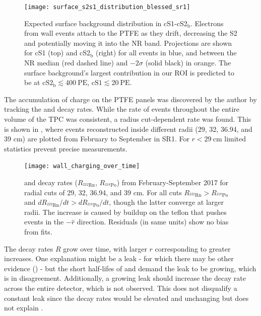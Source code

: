 \begin{figure}
\centering
\texttt{[image: surface\_s2s1\_distribution\_blessed\_sr1]}
\caption{Expected surface background distribution in cS1-cS2$_{\mathrm{b}}$.  Electrons from wall events attach to the PTFE as they drift,
decreasing the S2 and potentially moving it into the NR band.  Projections are
shown for cS1 (top) and cS2$_{\mathrm{b}}$ (right) for all events in blue, and between the NR median (red dashed line) and
$-2 \sigma$ (solid black) in orange.  The surface background's largest contribution in our ROI is predicted to be at
$\mathrm{cS2_{\mathrm{b}}} \lesssim 400\ \mathrm{PE}$, $\mathrm{cS1} \lesssim 20\ \mathrm{PE}$.}
\label{fig:backgrounds_detector_materials_bands}
\end{figure}

The accumulation of charge on the PTFE panels was discovered by the author by tracking the  and  decay
rates.  While the rate of events throughout the entire volume of the TPC was consistent, a radius cut-dependent rate was found.  This
is shown in , where events reconstructed inside different radii (29, 32, 36.94, and 39 cm) are
plotted from February to September in SR1.  For $r < 29\ \mathrm{cm}$ limited statistics prevent precise measurements.

\begin{figure}
\centering
\texttt{[image: wall\_charging\_over\_time]}
\caption{ and  decay rates ($R_{\mathrm{^{222}Rn}}$, $R_{\mathrm{^{218}Po}}$) from February-September 2017 for
radial cuts of 29, 32, 36.94, and 39 cm.  For all cuts $R_{\mathrm{^{222}Rn}} > R_{\mathrm{^{218}Po}}$ and
$dR_{\mathrm{^{222}Rn}}/dt > dR_{\mathrm{^{218}Po}}/dt$, though the latter converge at larger radii.  The increase is caused by \electron
buildup on the teflon that pushes events in the $-\hat{r}$ direction.  Residuals (in same units) show no bias from fits.}
\label{fig:backgrounds_wall_charge}
\end{figure}

The decay rates $R$ grow over time, with larger $r$ corresponding to greater increases.  One explanation might be a leak - for
which there may be other evidence () - but the
short half-lifes of  and  demand the leak to be growing, which is in disagreement.  Additionally, a growing
leak should increase the decay rate across the entire detector, which is not observed.  This does not disqualify a constant leak since
the decay rates would be elevated and unchanging but does not explain .

